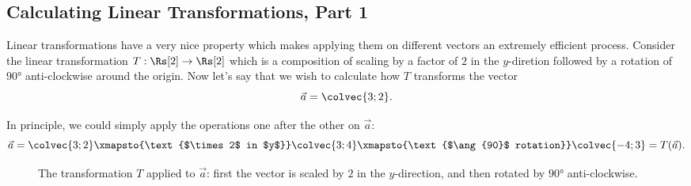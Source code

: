 
\subsection{Calculating Linear Transformations, Part 1}
Linear transformations have a very nice property which makes applying them on different vectors an extremely efficient process. Consider the linear transformation $T:\Rs[2]\to\Rs[2]$ which is a composition of scaling by a factor of $2$ in the $y$-diretion followed by a rotation of $\ang{90}$ anti-clockwise around the origin. Now let's say that we wish to calculate how $T$ transforms the vector
$$\vec{a}=\colvec{3;2}.$$

In principle, we could simply apply the operations one after the other on $\vec{a}$:
\begin{equation}
	\vec{a} = \colvec{3;2} \xmapsto{\text{$\times 2$ in $y$}} \colvec{3;4} \xmapsto{\text{$\ang{90}$ rotation}} \colvec{-4;3} = T(\vec{a}).
	\label{eq:simple_LT_example_single_2d_vec}
\end{equation}

\begin{figure}[h]
	\begin{center}
	\end{center}
	\caption{The transformation $T$ applied to $\vec{a}$: first the vector is scaled by $2$ in the $y$-direction, and then rotated by $\ang{90}$ anti-clockwise.}
	\label{fig:simple_LT_example_single_2d_vec}
\end{figure}

